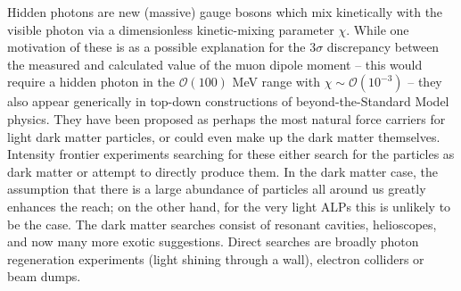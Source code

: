 Hidden photons are new (massive) gauge bosons which mix kinetically with the visible photon via a dimensionless kinetic-mixing parameter $\chi$. While one motivation of these is as a possible explanation for the $3\sigma$ discrepancy between the measured and calculated value of the muon dipole moment -- this would require a hidden photon in the $\mathcal{O}(100)$ MeV range with $\chi \sim \mathcal{O}(10^{-3})$ -- they also appear generically in top-down constructions of beyond-the-Standard Model physics. They have been proposed as perhaps the most natural force carriers for light dark matter particles, or could even make up the dark matter themselves. Intensity frontier experiments searching for these either search for the particles as dark matter or attempt to directly produce them. In the dark matter case, the assumption that there is a large abundance of particles all around us greatly enhances the reach; on the other hand, for the very light ALPs this is unlikely to be the case. The dark matter searches consist of resonant cavities, helioscopes, and now many more exotic suggestions. Direct searches are broadly photon regeneration experiments (light shining through a wall), electron colliders or beam dumps. 

